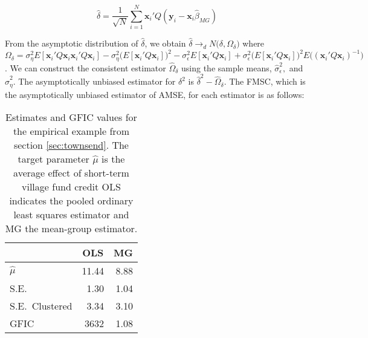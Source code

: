\[
\widehat{\delta} = \frac{1}{\sqrt{N}} \sum_{i=1}^N \mathbf{x}_i'Q(\mathbf{y}_i - \mathbf{x}_i \widehat{\beta}_{MG})
\]

From the asymptotic distribution of $\widehat{\delta}$, we obtain $\widehat{\delta} \rightarrow_d N\big(\delta , \Omega_\delta\big)$ where $\Omega_\delta = \sigma_\eta^2 E[\mathbf{x}_i'Q \mathbf{x}_i \mathbf{x}_i'Q\mathbf{x}_i] - \sigma_\eta^2 \big(E[\mathbf{x}_i'Q\mathbf{x}_i]\big)^2 - \sigma_\epsilon^2 E[\mathbf{x}_i'Q\mathbf{x}_i] + \sigma_\epsilon^2 \big(E[\mathbf{x}_i'Q\mathbf{x}_i]\big)^2 E\big((\mathbf{x}_i'Q\mathbf{x}_i)^{-1}\big)$. We can construct the consistent estimator $\widehat{\Omega}_\delta$ using the sample means, $\widehat{\sigma}_\epsilon^2,$ and $\widehat{\sigma}_\eta^2$. The asymptotically unbiased estimator for $\delta^2$ is $\widehat{\delta}^2 - \widehat{\Omega}_\delta$. The FMSC, which is the asymptotically unbiased estimator of AMSE, for each estimator is as follows:




\begin{table}[htbp]
  \centering
\begin{tabular}{lrr}
\hline
\hline
& \multicolumn{1}{c}{OLS} & \multicolumn{1}{c}{MG}\\ 
\hline
$\widehat{\mu}$  &  11.44 & 8.88\\
S.E.\ & 1.30 &  1.04\\
S.E.\ Clustered & 3.34& 3.10\\
GFIC &  3632 & 1.08\\
\hline
\end{tabular}
\caption{Estimates and GFIC values for the empirical example from section \ref{sec:townsend}.
The target parameter $\widehat{\mu}$ is the average effect of short-term village fund credit 
OLS indicates the pooled ordinary least squares estimator and MG the mean-group estimator.}
\label{tab:village}
\end{table}
